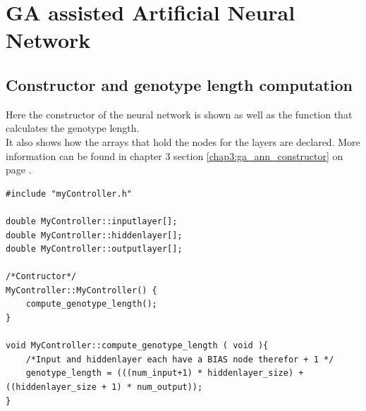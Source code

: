 \section{GA assisted Artificial Neural Network}
\subsection{Constructor and genotype length computation}
\label{code:ga_ann_constructor}
Here the constructor of the neural network is shown as well as the function that calculates the genotype length. \\
It also shows how the arrays that hold the nodes for the layers are declared. More information can be found in chapter 3 section \ref{chap3:ga_ann_constructor} on page \pageref{chap3:ga_ann_constructor}.


\begin{lstlisting}[caption = {GA assisted Artificial Neural Network constructor and genotype length computation}]
#include "myController.h"

double MyController::inputlayer[];
double MyController::hiddenlayer[];
double MyController::outputlayer[];

/*Contructor*/
MyController::MyController() {
    compute_genotype_length();
}

void MyController::compute_genotype_length ( void ){
    /*Input and hiddenlayer each have a BIAS node therefor + 1 */
    genotype_length = (((num_input+1) * hiddenlayer_size) + ((hiddenlayer_size + 1) * num_output));
}
\end{lstlisting}

